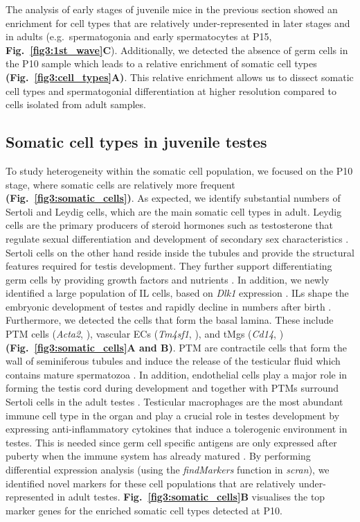 The analysis of early stages of juvenile mice in the previous section showed an enrichment for cell types that are relatively under-represented in later stages and in adults (e.g.~spermatogonia and early spermatocytes at P15, \textbf{Fig.~\ref{fig3:1st_wave}C}). Additionally, we detected the absence of germ cells in the P10 sample which leads to a relative enrichment of somatic cell types \textbf{(Fig.~\ref{fig3:cell_types}A)}. This relative enrichment allows us to dissect somatic cell types and spermatogonial differentiation at higher resolution compared to cells isolated from adult samples.

\subsection{Somatic cell types in juvenile testes}

To study heterogeneity within the somatic cell population, we focused on the P10 stage, where somatic cells are relatively more frequent \textbf{(Fig.~\ref{fig3:somatic_cells})}. As expected, we identify substantial numbers of Sertoli and Leydig cells, which are the main somatic cell types in adult. Leydig cells are the primary producers of steroid hormones such as testosterone that regulate sexual differentiation and development of secondary sex characteristics \citep{Svechnikov2010, Haider2004}. Sertoli cells on the other hand reside inside the tubules and provide the structural features required for testis development. They further support differentiating germ cells by providing growth factors and nutrients  \citep{Griswold1998}. In addition, we newly identified a large population of \gls{IL} cells, based on \textit{Dlk1} expression \citep{Lottrup2014}. ILs shape the embryonic development of testes and rapidly decline in numbers after birth \citep{Griswold2009}. \\

Furthermore, we detected the cells that form the basal lamina. These include \gls{PTM} cells (\textit{Acta2}, \citep{Cool2008}), vascular \glspl{EC} (\textit{Tm4sf1}, \citep{Shih2009}), and \glspl{tMg} (\textit{Cd14}, \citep{Kitchens2000}) \textbf{(Fig.~\ref{fig3:somatic_cells}A and B)}. PTM are contractile cells that form the wall of seminiferous tubules and induce the release of the testicular fluid which contains mature spermatozoa \citep{Diez-Torre2011}. In addition, endothelial cells play a major role in forming the testis cord during development and together with PTMs surround Sertoli cells in the adult testes \citep{Combes2009}. Testicular macrophages are the most abundant immune cell type in the organ and play a crucial role in testes development by expressing anti-inflammatory cytokines that induce a tolerogenic environment in testes. This is needed since germ cell specific antigens are only expressed after puberty when the immune system has already matured \citep{Fijak2006}. By performing differential expression analysis (using the \emph{findMarkers} function in \emph{scran}), we identified novel markers for these cell populations that are relatively under-represented in adult testes. \textbf{Fig.~\ref{fig3:somatic_cells}B} visualises the top marker genes for the enriched somatic cell types detected at P10.\\

